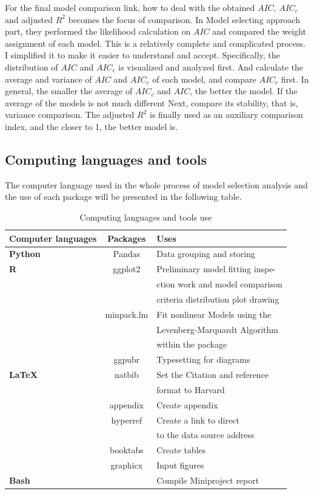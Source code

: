 \documentclass[11pt]{article}
\begin{document}
For the final model comparison link, how to deal with the obtained $AIC$, $AIC_c$ and adjusted $R^2$ becomes the focus of comparison. In \cite{johnson2004model} Model selecting approach part, they performed the likelihood calculation on $AIC$ and compared the weight assignment of each model. This is a relatively complete and complicated process. I simplified it to make it easier to understand and accept. Specifically, the distribution of $AIC$ and $AIC_c$ is visualized and analyzed first. And calculate the average and variance of $AIC$ and $AIC_c$ of each model, and compare $AIC_c$ first. In general, the smaller the average of $AIC_c$ and $AIC$, the better the model. If the average of the models is not much different Next, compare its stability, that is, variance comparison. The adjusted $R^2$ is finally used as an auxiliary comparison index, and the closer to 1, the better model is.

\subsection{Computing languages and tools}
The computer language used in the whole process of model selection analysis and the use of each package will be presented in the following table.

\begin{table}[htbp]
    \centering
    \caption{Computing languages and tools use}
    \label{tab:univ-compa}
    \begin{tabular}{lcl}
    \toprule
         \textbf{Computer languages} & \textbf{Packages} & \textbf{Uses}\\ \midrule
         \textbf{Python} & Pandas & Data grouping and storing\\
         \midrule
         \textbf{R} & ggplot2 & Preliminary model fitting inspe- \\
         &  & ction work and model comparison\\
         & & criteria distribution  plot drawing\\
          &  minpack.lm & Fit nonlinear Models using the  \\
         &  & Levenberg-Marquardt Algorithm\\
         & & within the package\\
        & ggpubr & Typesetting for diagrams\\
        \midrule
       \textbf{LaTeX} & natbib & Set the Citation and reference \\
        & & format to Harvard\\
        & appendix & Create appendix\\
         & hyperref & Create a link to direct \\
        & & to the data source address\\
        & booktabs & Create tables\\
        & graphicx & Input figures  \\
        \midrule
        \textbf{Bash} & & Compile Miniproject report \\
        \toprule
    \end{tabular}
    \label{tab:my_label}
\end{table}
\end{document}
